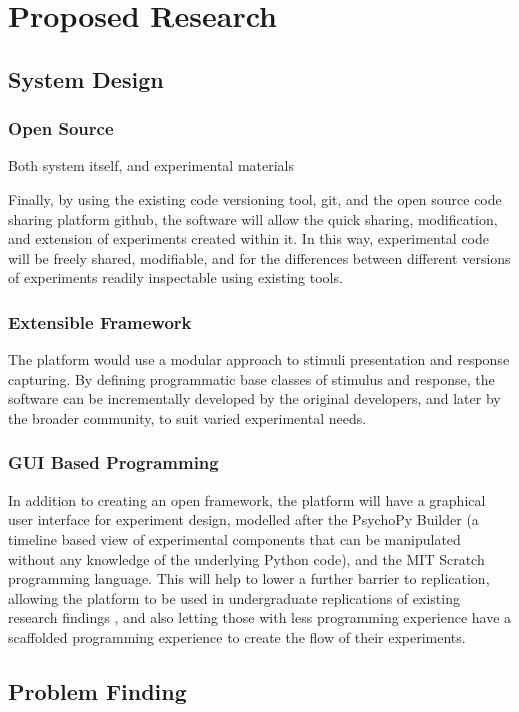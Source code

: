\documentclass[12pt,a4paper,titlepage]{scrreprt}
\begin{document}
\chapter{Proposed Research}
\section{System Design}
\subsection{Open Source}
Both system itself, and experimental materials

Finally, by using the existing code versioning tool, git\cite{_git_????}, and the open source code sharing platform github\cite{_github_????}, the software will allow the quick sharing, modification, and extension of experiments created within it. In this way, experimental code will be freely shared, modifiable, and for the differences between different versions of experiments readily inspectable using existing tools.
\subsection{Extensible Framework}
The platform would use a modular approach to stimuli presentation and response capturing. By defining programmatic base classes of stimulus and response, the software can be incrementally developed by the original developers, and later by the broader community, to suit varied experimental needs. 
\subsection{GUI Based Programming}
In addition to creating an open framework, the platform will have a graphical user interface for experiment design, modelled after the PsychoPy Builder (a timeline based view of experimental components that can be manipulated without any knowledge of the underlying Python code), and the MIT Scratch programming language\cite{resnick_scratch:_2009}. This will help to lower a further barrier to replication, allowing the platform to be used in undergraduate replications of existing research findings \cite{frank_teaching_2012}, and also letting those with less programming experience have a scaffolded programming experience to create the flow of their experiments.
\section{Problem Finding}
\end{document}
